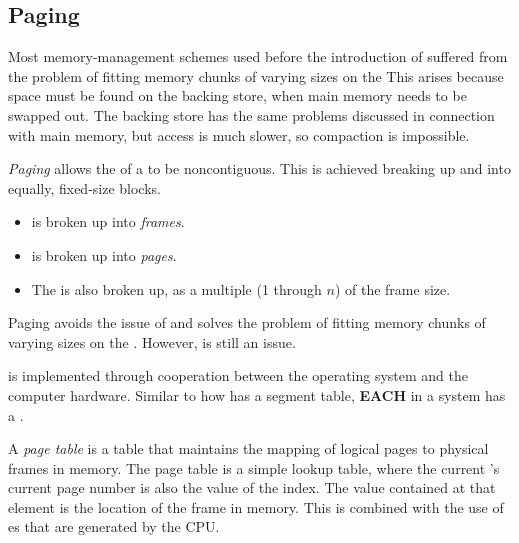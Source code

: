 \subsection{Paging}\label{subsec:Paging}
Most memory-management schemes used before the introduction of  suffered from the problem of fitting memory chunks of varying sizes on the 
This arises because space must be found on the backing store, when main memory needs to be swapped out.
The backing store has the same  problems discussed in connection with main memory, but access is much slower, so compaction is impossible.

\begin{definition}[Paging]\label{def:Paging}
  \emph{Paging} allows the  of a  to be noncontiguous.
  This is achieved breaking up  and  into equally, fixed-size blocks.
  \begin{itemize}[noitemsep]
  \item {} is broken up into \emph{frames}.
  \item {} is broken up into \emph{pages}.
  \item The  is also broken up, as a multiple (1 through $n$) of the frame size.
  \end{itemize}

  Paging avoids the issue of  and solves the problem of fitting memory chunks of varying sizes on the .
  However,  is still an issue.
\end{definition}

 is implemented through cooperation between the operating system and the computer hardware.
Similar to how  has a segment table, \textbf{EACH } in a  system has a .

\begin{definition}\label{def:Page_Table}
  A \emph{page table} is a table that maintains the mapping of logical pages to physical frames in memory.
  The page table is a simple lookup table, where the current 's current page number is also the value of the index.
  The value contained at that element is the location of the frame in memory.
  This is combined with the use of es that are generated by the CPU.\@
\end{definition}

